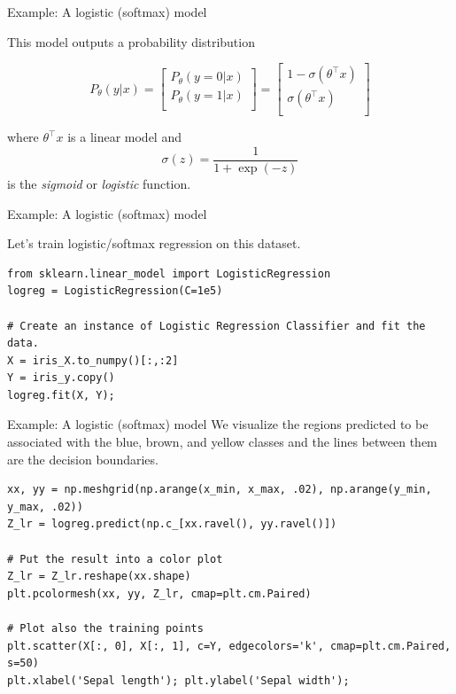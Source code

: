 \documentclass[../../generative_classifiers.tex]{subfiles}
\begin{document}
\begin{frame}[fragile]{Example: A logistic (softmax) model}

This model outputs a probability distribution 

$$
P_\theta(y| x) 
= \left[ \begin{array}{c}
P_\theta(y=0| x) \\
P_\theta(y=1| x) \\
\end{array} \right]
= \left[ \begin{array}{c}
1-\sigma(\theta^\top x) \\
\sigma(\theta^\top x) \\
\end{array} \right]
$$

where $\theta^\top x$ is a linear model and
$$\sigma(z) = \frac{1}{1 + \exp(-z)}$$
is the \textit{sigmoid} or \textit{logistic} function.

\end{frame}

\begin{frame}[fragile]{Example: A logistic (softmax) model}

Let's train logistic/softmax regression on this dataset.


\begin{lstlisting}
from sklearn.linear_model import LogisticRegression
logreg = LogisticRegression(C=1e5)

# Create an instance of Logistic Regression Classifier and fit the data.
X = iris_X.to_numpy()[:,:2]
Y = iris_y.copy()
logreg.fit(X, Y);
\end{lstlisting}

\end{frame}

\begin{frame}[fragile]{Example: A logistic (softmax) model}
We visualize the regions predicted to be associated with the blue, brown, and yellow classes and the lines between them are the decision boundaries.

\begin{lstlisting}
xx, yy = np.meshgrid(np.arange(x_min, x_max, .02), np.arange(y_min, y_max, .02))
Z_lr = logreg.predict(np.c_[xx.ravel(), yy.ravel()])

# Put the result into a color plot
Z_lr = Z_lr.reshape(xx.shape)
plt.pcolormesh(xx, yy, Z_lr, cmap=plt.cm.Paired)

# Plot also the training points
plt.scatter(X[:, 0], X[:, 1], c=Y, edgecolors='k', cmap=plt.cm.Paired, s=50)
plt.xlabel('Sepal length'); plt.ylabel('Sepal width');

\end{lstlisting}
\end{frame}
\end{document}
